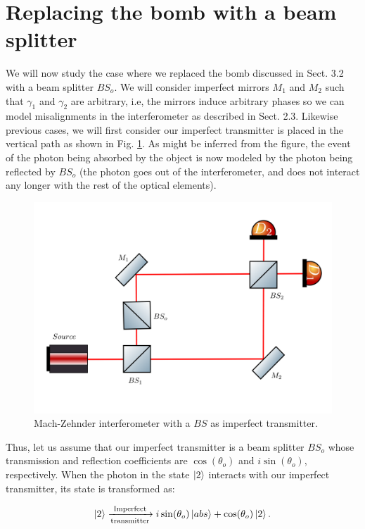 \documentclass[12pt]{book}
\begin{document}
\section{Replacing the bomb with a beam splitter}

We will now study the case where we replaced the bomb discussed in Sect. 3.2 with a beam splitter $BS_{o}$. We will consider imperfect mirrors $M_{1}$ and $M_{2}$ such that $\gamma_{1}$ and $\gamma_{2}$ are arbitrary, i.e, the mirrors induce arbitrary phases so we can model misalignments in the interferometer as described in Sect. 2.3.  Likewise  previous cases, we will first consider our imperfect transmitter is placed in the vertical path as shown in Fig. \ref{bs vertical}. As might be inferred from the figure, the event of the photon being absorbed by the object is now modeled by the photon being reflected by $BS_{o}$ (the photon goes out of the interferometer, and does not interact any longer with the rest of the optical elements).



\begin{figure}[t!]
\centering
\includegraphics[width=\linewidth,height=7.5 cm]{images/machzenhderbs.png}
\caption{Mach-Zehnder interferometer with a $BS$ as imperfect transmitter.}
\label{bs vertical}
\end{figure}

Thus, let us assume that our imperfect transmitter is a beam splitter $BS_{o}$ whose transmission and reflection coefficients are $\cos(\theta_{o})$ and $i\sin(\theta_{o})$, respectively. When the photon in the state $\ket{2}$ interacts with our imperfect transmitter, its state is transformed as:

\begin{align}
\ket{2}\xrightarrow[\text{transmitter}]{\text{Imperfect}}i\sin(\theta_{o}) \ket{abs} +\cos(\theta_{o}) \ket{2}.
\end{align}
\end{document}
